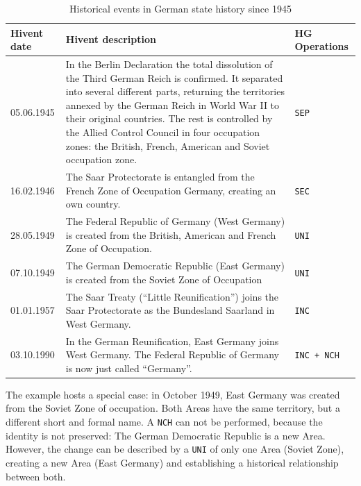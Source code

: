 \begin{table}[H]
\begin{center}
\begin{tabular}{l p{8.5cm} l}
  \toprule
  Hivent date & Hivent description & HG Operations \\
  \midrule

    05.06.1945
  & \footnotesize{In the Berlin Declaration the total dissolution of the Third German Reich is confirmed. It separated into several different parts, returning the territories annexed by the German Reich in World War II to their original countries. The rest is controlled by the Allied Control Council in four occupation zones: the British, French, American and Soviet occupation zone.}
  & \texttt{SEP} \\

    16.02.1946
  & \footnotesize{The Saar Protectorate is entangled from the French Zone of Occupation Germany, creating an own country.}
  & \texttt{SEC} \\

    28.05.1949
  & \footnotesize{The Federal Republic of Germany (West Germany) is created from the British, American and French Zone of Occupation.}
  & \texttt{UNI} \\

    07.10.1949
  & \footnotesize{The German Democratic Republic (East Germany) is created from the Soviet Zone of Occupation}
  & \texttt{UNI} \\

    01.01.1957
  & \footnotesize{The Saar Treaty (``Little Reunification'') joins the Saar Protectorate as the Bundesland Saarland in West Germany.}
  & \texttt{INC} \\

    03.10.1990
  & \footnotesize{In the German Reunification, East Germany joins West Germany. The Federal Republic of Germany is now just called ``Germany''.}
  & \texttt{INC + NCH} \\

  \bottomrule
\end{tabular}
\caption{Historical events in German state history since 1945}
\label{tab:german_history_since_1945}
\end{center}
\end{table}

The example hosts a special case: in October 1949, East Germany was created from the Soviet Zone of occupation. Both Areas have the same territory, but a different short and formal name. A \texttt{NCH} can not be performed, because the identity is not preserved: The German Democratic Republic is a new Area. However, the change can be described by a \texttt{UNI} of only one Area (Soviet Zone), creating a new Area (East Germany) and establishing a historical relationship between both.

